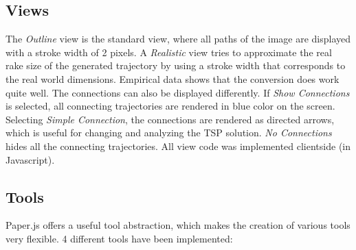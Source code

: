 \subsection{Views} The \textit{Outline} view is the standard view, where all paths of the image are displayed with a stroke width of 2 pixels. A \textit{Realistic} view tries to approximate the real rake size of the generated trajectory by using a stroke width that corresponds to the real world dimensions. Empirical data shows that the conversion does work quite well. The connections can also be displayed differently. If \textit{Show Connections} is selected, all connecting trajectories are rendered in blue color on the screen. Selecting \textit{Simple Connection}, the connections are rendered as directed arrows, which is useful for changing and analyzing the TSP solution. \textit{No Connections} hides all the connecting trajectories. All view code was implemented clientside (in Javascript).

\subsection{Tools}

Paper.js offers a useful tool abstraction, which makes the creation of various tools very flexible. 4 different tools have been implemented:

